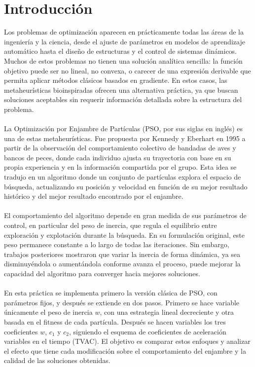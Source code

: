 \setcounter{page}{1} 

\section{Introducción}
Los problemas de optimización aparecen en prácticamente todas las áreas de la ingeniería y la ciencia, desde el ajuste de parámetros en modelos de aprendizaje automático hasta el diseño de estructuras y el control de sistemas dinámicos. Muchos de estos problemas no tienen una solución analítica sencilla: la función objetivo puede ser no lineal, no convexa, o carecer de una expresión derivable que permita aplicar métodos clásicos basados en gradiente. En estos casos, las metaheurísticas bioinspiradas ofrecen una alternativa práctica, ya que buscan soluciones aceptables sin requerir información detallada sobre la estructura del problema.
\\\\
La Optimización por Enjambre de Partículas (PSO, por sus siglas en inglés) es una de estas metaheurísticas. Fue propuesta por Kennedy y Eberhart en 1995 a partir de la observación del comportamiento colectivo de bandadas de aves y bancos de peces, donde cada individuo ajusta su trayectoria con base en su propia experiencia y en la información compartida por el grupo. Esta idea se tradujo en un algoritmo donde un conjunto de partículas explora el espacio de búsqueda, actualizando su posición y velocidad en función de su mejor resultado histórico y del mejor resultado encontrado por el enjambre.
\\\\
El comportamiento del algoritmo depende en gran medida de sus parámetros de control, en particular del peso de inercia, que regula el equilibrio entre exploración y explotación durante la búsqueda. En su formulación original, este peso permanece constante a lo largo de todas las iteraciones. Sin embargo, trabajos posteriores mostraron que variar la inercia de forma dinámica, ya sea disminuyéndola o aumentándola conforme avanza el proceso, puede mejorar la capacidad del algoritmo para converger hacia mejores soluciones.
\\\\
En esta práctica se implementa primero la versión clásica de PSO, con parámetros fijos, y después se extiende en dos pasos. Primero se hace variable únicamente el peso de inercia $w$, con una estrategia lineal decreciente y otra basada en el fitness de cada partícula. Después se hacen variables los tres coeficientes $w$, $c_1$ y $c_2$, siguiendo el esquema de coeficientes de aceleración variables en el tiempo (TVAC). El objetivo es comparar estos enfoques y analizar el efecto que tiene cada modificación sobre el comportamiento del enjambre y la calidad de las soluciones obtenidas.
